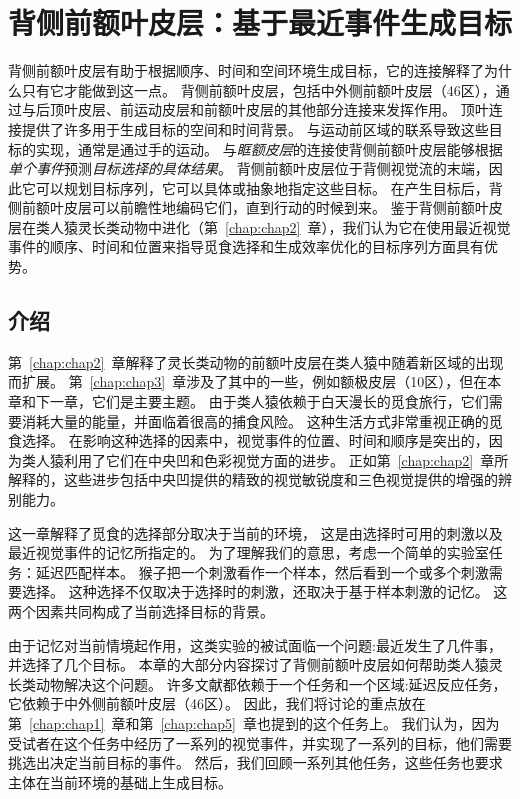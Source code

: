 \chapter{背侧前额叶皮层：基于最近事件生成目标} \label{chap:chap6}

背侧前额叶皮层有助于根据顺序、时间和空间环境生成目标，它的连接解释了为什么只有它才能做到这一点。
背侧前额叶皮层，包括中外侧前额叶皮层（46区），通过与后顶叶皮层、前运动皮层和前额叶皮层的其他部分连接来发挥作用。
顶叶连接提供了许多用于生成目标的空间和时间背景。
与运动前区域的联系导致这些目标的实现，通常是通过手的运动。
与\textit{眶额皮层}的连接使背侧前额叶皮层能够根据\textit{单个事件}预测\textit{目标选择的具体结果}。
背侧前额叶皮层位于背侧视觉流的末端，因此它可以规划目标序列，它可以具体或抽象地指定这些目标。
在产生目标后，背侧前额叶皮层可以前瞻性地编码它们，直到行动的时候到来。
鉴于背侧前额叶皮层在类人猿灵长类动物中进化（第~\ref{chap:chap2}~章），我们认为它在使用最近视觉事件的顺序、时间和位置来指导觅食选择和生成效率优化的目标序列方面具有优势。



\section{介绍}

第~\ref{chap:chap2}~章解释了灵长类动物的前额叶皮层在类人猿中随着新区域的出现而扩展。
第~\ref{chap:chap3}~章涉及了其中的一些，例如额极皮层（10区），但在本章和下一章，它们是主要主题。
由于类人猿依赖于白天漫长的觅食旅行，它们需要消耗大量的能量，并面临着很高的捕食风险。
这种生活方式非常重视正确的觅食选择。
在影响这种选择的因素中，视觉事件的位置、时间和顺序是突出的，因为类人猿利用了它们在中央凹和色彩视觉方面的进步。
正如第~\ref{chap:chap2}~章所解释的，这些进步包括中央凹提供的精致的视觉敏锐度和三色视觉提供的增强的辨别能力。


这一章解释了觅食的选择部分取决于当前的环境，
这是由选择时可用的刺激以及最近视觉事件的记忆所指定的。
为了理解我们的意思，考虑一个简单的实验室任务：延迟匹配样本。
猴子把一个刺激看作一个样本，然后看到一个或多个刺激需要选择。
这种选择不仅取决于选择时的刺激，还取决于基于样本刺激的记忆。
这两个因素共同构成了当前选择目标的背景。


由于记忆对当前情境起作用，这类实验的被试面临一个问题:最近发生了几件事，并选择了几个目标。
本章的大部分内容探讨了背侧前额叶皮层如何帮助类人猿灵长类动物解决这个问题。
许多文献都依赖于一个任务和一个区域:延迟反应任务，它依赖于中外侧前额叶皮层（46区）。
因此，我们将讨论的重点放在第~\ref{chap:chap1}~章和第~\ref{chap:chap5}~章也提到的这个任务上。
我们认为，因为受试者在这个任务中经历了一系列的视觉事件，并实现了一系列的目标，他们需要挑选出决定当前目标的事件。
然后，我们回顾一系列其他任务，这些任务也要求主体在当前环境的基础上生成目标。



